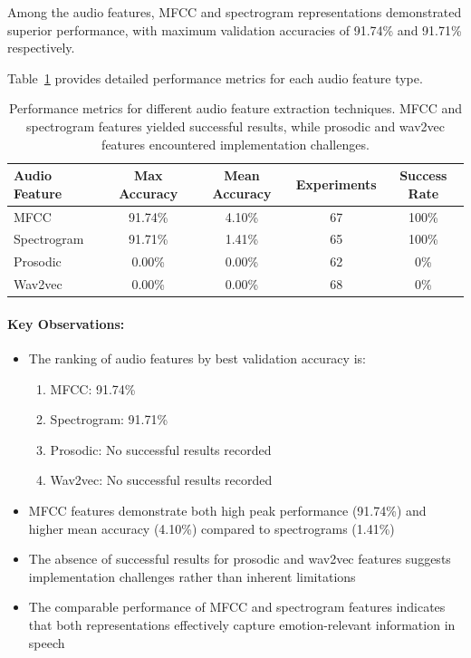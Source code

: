 \documentclass[12pt]{article}
\begin{document}
Among the audio features, MFCC and spectrogram representations demonstrated superior performance, with maximum validation accuracies of 91.74\% and 91.71\% respectively.

Table~\ref{tab:audio_feature_performance} provides detailed performance metrics for each audio feature type.

\begin{table}[h]
\centering
\begin{tabular}{|l|c|c|c|c|}
\hline
\textbf{Audio Feature} & \textbf{Max Accuracy} & \textbf{Mean Accuracy} & \textbf{Experiments} & \textbf{Success Rate} \\
\hline
MFCC & 91.74\% & 4.10\% & 67 & 100\% \\
\hline
Spectrogram & 91.71\% & 1.41\% & 65 & 100\% \\
\hline
Prosodic & 0.00\% & 0.00\% & 62 & 0\% \\
\hline
Wav2vec & 0.00\% & 0.00\% & 68 & 0\% \\
\hline
\end{tabular}
\caption{Performance metrics for different audio feature extraction techniques. MFCC and spectrogram features yielded successful results, while prosodic and wav2vec features encountered implementation challenges.}
\label{tab:audio_feature_performance}
\end{table}

\paragraph{Key Observations:}
\begin{itemize}
    \item The ranking of audio features by best validation accuracy is:
    \begin{enumerate}
        \item MFCC: 91.74\%
        \item Spectrogram: 91.71\%
        \item Prosodic: No successful results recorded
        \item Wav2vec: No successful results recorded
    \end{enumerate}
    
    \item MFCC features demonstrate both high peak performance (91.74\%) and higher mean accuracy (4.10\%) compared to spectrograms (1.41\%)
    
    \item The absence of successful results for prosodic and wav2vec features suggests implementation challenges rather than inherent limitations
    
    \item The comparable performance of MFCC and spectrogram features indicates that both representations effectively capture emotion-relevant information in speech
\end{itemize}
\end{document}
